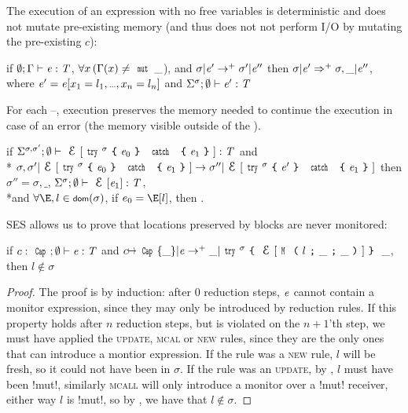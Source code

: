The execution of an expression
with no \Q@mut@ free variables is deterministic and does not
mutate pre-existing memory (and thus does not not perform I/O by mutating the pre-existing $c$):
\begin{Assumption}[Determinism]\rm
	if $\emptyset;\Gamma\vdash {\ensuremath{\mathit{e}}}:{\mathit{T}}$, 
	$\forall x\, ( \Gamma(x)\neq\Kw{mut}\,\_$), and
	$\sigma | {\mathit{e}}'\rightarrow^+ \sigma' | {\mathit{e}}''$
	then 
	$\sigma | {\mathit{e}}'\Rightarrow^+ \sigma,\_ | {\mathit{e}}''$,
	where $\e'=\e[x_1=l_1,\ldots,x_n=l_n]$ and $\Sigma^\sigma;\emptyset\vdash {\ensuremath{\mathit{e}}}':{\mathit{T}}$
\end{Assumption}

For each \Q@try@--\Q@catch@, execution preserves the memory needed to continue the execution in case of an error (the memory visible outside of the \Q@try@).
\begin{Assumption}\rm
	if $\Sigma^{\sigma,\sigma'};\emptyset\vdash \ctx[\Kw{try}^\sigma\oC\e_0\cC\ \Kw{catch}\ \oC\e_1\cC]:\T$
	and\\*\indent
	$
	\sigma,\sigma'|\ctx[\Kw{try}^\sigma\oC\e_0\cC\ \Kw{catch}\ \oC\e_1\cC]\rightarrow 
	\sigma''|\ctx[\Kw{try}^\sigma\oC\e'\cC\ \Kw{catch}\ \oC\e_1\cC]
	$
	then 
	$\sigma''=\sigma,\_$, $\Sigma^\sigma;\emptyset\vdash \ctx[\e_1]:\T$,
	\\*\indent and $\forall \E, l \in \dom(\sigma)$, if $e_0 = \E[l]$, then .
\end{Assumption}


SES allows us to prove that locations preserved by \Q@try@ blocks are never monitored:
\begin{Lemma}\rm
	if $c:\Kw{Cap};\emptyset\vdash \e: \T$ and $c\mapsto\Kw{Cap}\{\_\}|\e\rightarrow^+ \_|\Kw{try}^\sigma\oC\ctx[\M{l}{\_}{\_}]\cC\ \_$, then $l\notin\sigma$
\end{Lemma}
\begin{proof}
The proof is by induction: after 0 reduction steps, ${\mathit{e}}$ cannot contain a monitor expression, since they may only be introduced by reduction rules. If this property holds after $n$ reduction steps, but is violated on the $n+1$'th step, we must have applied the \textsc{update}, \textsc{mcal} or \textsc{new} rules, since they are the only ones that can introduce a montior expression. If the rule was a \textsc{new} rule, $l$ will be fresh, so it could not have been in $\sigma$. If the rule was an \textsc{update}, by , $l$ must have been \Q!mut!, similarly \textsc{mcall} will only introduce a monitor over a \Q!mut! receiver, either way $l$ is \Q!mut!, so by , we have that $l \notin \sigma$.
\end{proof}

